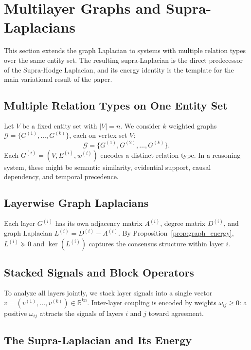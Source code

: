 \documentclass[11pt]{article}
\theoremstyle{definition}
\theoremstyle{remark}
\newcommand{\R}{\mathbb{R}}
\begin{document}
\section{Multilayer Graphs and Supra-Laplacians}
\label{sec:multilayer}

This section extends the graph Laplacian to systems with multiple relation
types over the same entity set. The resulting supra-Laplacian is the direct
predecessor of the Supra-Hodge Laplacian, and its energy identity is the
template for the main variational result of the paper.

\subsection{Multiple Relation Types on One Entity Set}

Let $V$ be a fixed entity set with $|V|=n$. We consider $k$ weighted graphs
$\mathcal{G} = \{G^{(1)},\dots,G^{(k)}\}$, each on vertex set $V$:
\[
  \mathcal{G} = \{G^{(1)}, G^{(2)}, \dots, G^{(k)}\}.
\]
Each $G^{(i)} = (V, E^{(i)}, w^{(i)})$ encodes a distinct relation type. In a
reasoning system, these might be semantic similarity, evidential support,
causal dependency, and temporal precedence.

\subsection{Layerwise Graph Laplacians}

Each layer $G^{(i)}$ has its own adjacency matrix $A^{(i)}$, degree matrix
$D^{(i)}$, and graph Laplacian $L^{(i)} = D^{(i)} - A^{(i)}$. By
Proposition~\ref{prop:graph_energy}, $L^{(i)} \succeq 0$ and $\ker(L^{(i)})$
captures the consensus structure within layer $i$.

\subsection{Stacked Signals and Block Operators}

To analyze all layers jointly, we stack layer signals into a single vector
$v = (v^{(1)},\dots,v^{(k)}) \in \R^{kn}$. Inter-layer coupling is encoded by
weights $\omega_{ij} \geq 0$: a positive $\omega_{ij}$ attracts the signals of
layers $i$ and $j$ toward agreement.

\subsection{The Supra-Laplacian and Its Energy}
\end{document}
